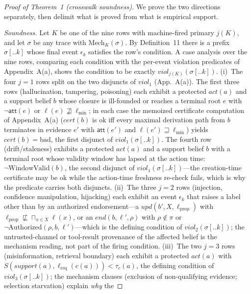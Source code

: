 \documentclass[conference]{IEEEtran}
\providecommand{\tc}{\tau_{c}}
\providecommand{\meet}{\sqcap}
\newcommand{\att}{\ensuremath{\mathsf{att}}}
\newcommand{\lmin}{\ensuremath{\ell_{\min}}}
\newcommand{\lreq}{\ensuremath{\ell_{\mathrm{req}}}}
\begin{document}
\begin{proof}[Proof of Theorem~1 (crosswalk soundness)]
We prove the two directions separately, then delimit what is proved
from what is empirical support.

\emph{Soundness.} Let $K$ be one of the nine rows with machine-fired
primary $j(K)$, and let $\sigma$ be any trace with
$\mathrm{Mech}_K(\sigma)$. By Definition~11 there is a prefix
$\sigma[..k]$ whose final event $\epsilon_k$ satisfies the row's
condition. A case analysis over the nine rows, comparing each
condition with the per-event violation predicates of Appendix~A(a),
shows the condition to be exactly
$\mathit{viol}_{j(K)}(\sigma[..k])$.
(i)~The four $j = 1$ rows split on the two disjuncts of
$\mathit{viol}_1$ (App.~A(a)). The first three rows (hallucination,
tampering, poisoning) each
exhibit a protected $\mathit{act}(a)$ and a support belief $b$ whose
closure is ill-founded or reaches a terminal root $e$ with
$\neg\att(e)$ or $\ell(e) \not\sqsupseteq \lmin$; in each case the
memoized certificate computation of Appendix~A(a) ($\mathit{cert}(b)$
is $\mathrm{ok}$ iff every maximal derivation path from $b$ terminates
in evidence $e'$ with $\att(e')$ and $\ell(e') \sqsupseteq \lmin$)
yields $\mathit{cert}(b) = \mathrm{bad}$, the first disjunct of
$\mathit{viol}_1(\sigma[..k])$. The fourth row (drift/staleness)
exhibits a protected $\mathit{act}(a)$ and a support belief $b$ with a
terminal root whose validity window has lapsed at the action time:
$\neg\mathrm{WindowValid}(b)$, the second disjunct of
$\mathit{viol}_1(\sigma[..k])$---the creation-time certificate may be
$\mathrm{ok}$ while the action-time freshness re-check fails, which is
why the predicate carries both disjuncts.
(ii)~The three $j = 2$ rows (injection, confidence manipulation,
hijacking) each exhibit an event $\epsilon_k$ that raises a label other
than by an authorized endorsement---a $\mathit{upd}(b', X,
\ell_{\mathrm{prop}})$ with $\ell_{\mathrm{prop}} \not\sqsubseteq
\meet_{x \in X} \ell(x)$, or an $\mathit{end}(b, \ell', \rho)$ with
$\rho \notin \pi$ or $\neg\mathrm{Authorized}(\rho, b, \ell')$---which
is the defining condition of $\mathit{viol}_2(\sigma[..k])$; the
untrusted-channel or tool-result provenance of the affected belief is
the mechanism reading, not part of the firing condition.
(iii)~The two $j = 3$ rows (misinformation, retrieval boundary) each
exhibit a protected $\mathit{act}(a)$ with $S(\mathit{support}(a),
\lreq(c(a))) < \tc(a)$, the defining condition of
$\mathit{viol}_3(\sigma[..k])$; the mechanism clauses (exclusion of
non-qualifying evidence; selection starvation) explain \emph{why} the

\end{proof}
\end{document}
